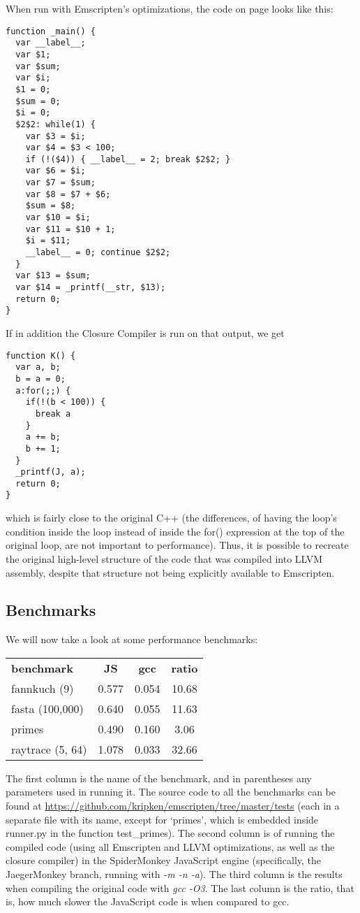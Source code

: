\documentclass[11pt]{proc}
\begin{document}
When run with Emscripten's optimizations, the code on page \pageref{code:example} looks
like this:
\begin{verbatim}
function _main() {
  var __label__;
  var $1;
  var $sum;
  var $i;
  $1 = 0;
  $sum = 0;
  $i = 0;
  $2$2: while(1) {
    var $3 = $i;
    var $4 = $3 < 100;
    if (!($4)) { __label__ = 2; break $2$2; }
    var $6 = $i;
    var $7 = $sum;
    var $8 = $7 + $6;
    $sum = $8;
    var $10 = $i;
    var $11 = $10 + 1;
    $i = $11;
    __label__ = 0; continue $2$2;
  }
  var $13 = $sum;
  var $14 = _printf(__str, $13);
  return 0;
}
\end{verbatim}
If in addition the Closure Compiler is run on that output, we get
\begin{verbatim}
function K() {
  var a, b;
  b = a = 0;
  a:for(;;) {
    if(!(b < 100)) {
      break a
    }
    a += b;
    b += 1;
  }
  _printf(J, a);
  return 0;
}
\end{verbatim}
which is fairly close to the original C++ (the differences, of
having the loop's condition inside the loop instead of inside
the for() expression at the top of the original loop, are not important to performance). Thus, it is possible
to recreate the original high-level structure of the code that
was compiled into LLVM assembly, despite that structure not being
explicitly available to Emscripten.

\subsection{Benchmarks}

We will now take a look at some performance benchmarks:

\bigskip

\begin{tabular}{ l | c | c | c }
  \hline
  \textbf{benchmark} & \textbf{JS} & \textbf{gcc} & \textbf{ratio} \\
  fannkuch (9)     & 0.577 & 0.054 &  10.68 \\
  fasta (100,000)  & 0.640 & 0.055 &  11.63 \\
  primes           & 0.490 & 0.160 &   3.06 \\
  raytrace (5, 64) & 1.078 & 0.033 &  32.66 \\
  \hline
\end{tabular}

\bigskip

The first column is the name of the benchmark, and in parentheses any
parameters used in running it. The source code to all the benchmarks
can be found at \url{https://github.com/kripken/emscripten/tree/master/tests}
(each in a separate file with its name, except for `primes', which is
embedded inside runner.py in the function test\_primes). The second
column is of running the compiled code (using all Emscripten and LLVM
optimizations, as well as the closure compiler) in the SpiderMonkey JavaScript
engine (specifically, the JaegerMonkey branch, running with \emph{-m -n -a}).
The third column is the results when compiling the original code with \emph{gcc -O3}.
The last column is the ratio, that is, how much slower the JavaScript code is
when compared to gcc.
\end{document}
